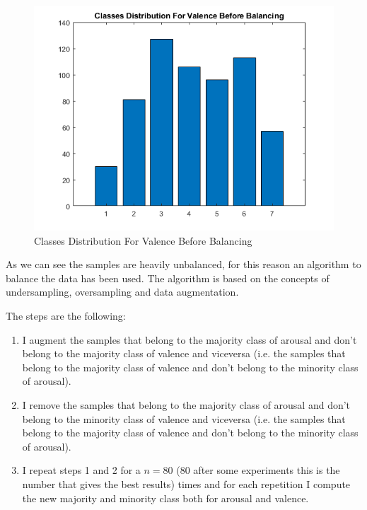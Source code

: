 \documentclass[a4paper]{report}
\begin{document}
	\begin{figure}[htpb]
		\centering
		\includegraphics[scale=0.7]{img/beforeBalancingValence.png}
		\caption{Classes Distribution For Valence Before Balancing}
		\label{beforeBalancingValence}
	\end{figure}


\noindent As we can see the samples are heavily unbalanced, for this reason an algorithm to balance the data has been used. The algorithm is based on the concepts of undersampling, oversampling and data augmentation.

\noindent The steps are the following:
\begin{enumerate}
	\item I augment the samples that belong to the majority class of arousal 
	 and don't belong to the majority class of valence and viceversa (i.e. the samples that 
	 belong to the majority class of valence and don't belong to the minority
	 class of arousal).
	 
	 \item I remove the samples that belong to the majority class of 
	 arousal and don't belong to the minority class of valence and viceversa (i.e. the
	 samples that belong to the majority class of valence and don't belong to
	 the minority class of arousal).
	
	 \item I repeat steps 1 and 2 for a $n=80$ ($80$ after some experiments this is the number that gives the best results) times and for each repetition I compute the new majority and minority class both for arousal and valence.
	 
\end{enumerate}
\end{document}
